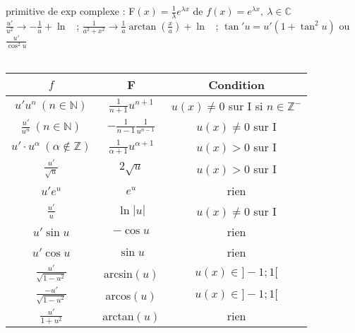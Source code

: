 \documentclass[12 pt]{book}
\begin{document}
\begin{flushleft}
\begin{doublespace}

	primitive de exp complexe : F$(x)=\frac{1}{\lambda}e^{\lambda x}$ de $f(x) = e^{\lambda x}, \ \lambda \in \mathbb{C}$\\
	$\frac{u'}{u^2} \rightarrow - \frac{1}{u} +\ln$ \ ; $\frac{1}{a^2+x^2} \rightarrow \frac{1}{a} \arctan(\frac{x}{a}) + \ln $ \ ; $ \tan' u = u'(1+\tan^2 u)$ ou $ \frac{u'}{\cos^2 u}$\\
	\text{}\\
	\begin{tabular}{|c|c|c|}
	\hline
	$f$ & F & Condition  \\
	\hline
	$u' u^n \ (n\in \mathbb{N})$ & $\frac{1}{n+1} u^{n+1}$ & $u(x) \ne 0$ sur I si $n\in \mathbb{Z}^-$  \\
	\hline
	 $\frac{u'}{u^n} \ (n\in\mathbb{N})$ & $-\frac{1}{n-1} \frac{1}{u^{n-1}}$ & $u(x)\ne 0$ sur I\\
	\hline
	 $u' \cdot u^\alpha \ (\alpha \notin \mathbb{Z})$ & $\frac{1}{\alpha + 1} u^{\alpha +1}$ & $u(x)>0$ sur I\\
	\hline
	$\frac{u'}{\sqrt{u}}$ & $ 2 \sqrt{u} $ & $ u(x)>0$ sur I  \\
	\hline
	 $u' e^u$&$e^u$& rien\\
	\hline
	 $\frac{u'}{u}$&$\ln |u|$&$u(x)\ne 0$ sur I\\
	\hline
	 $u'\sin u $ & $ - \cos u$ & rien\\
	\hline
	 $u'\cos u$&$\sin u$& rien\\
	\hline
	$\frac{u'}{\sqrt{1-u^2}}$&arcsin$(u)$&$u(x) \in ]-1;1[$\\
	\hline
	$\frac{-u'}{\sqrt{1-u^2}}$& arcos$(u)$&$u(x) \in ]-1;1[$\\
	\hline
	$\frac{u'}{1+u^2}$& arctan$(u)$& rien\\
	\hline
	\end{tabular}
	

\end{doublespace}
\end{flushleft}
\end{document}

